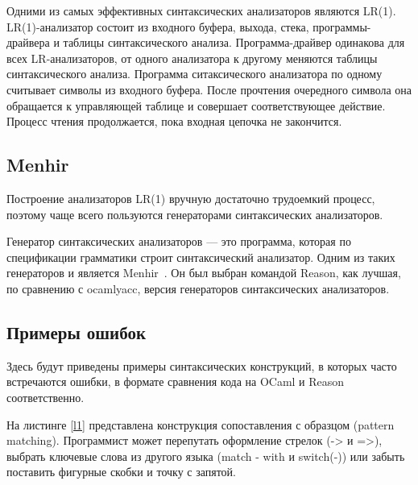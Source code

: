 Одними из самых эффективных синтаксических анализаторов являются LR(1)\cite{LRSpeed}. LR(1)-анализатор состоит из входного буфера, выхода, стека, программы-драйвера и таблицы синтаксического анализа. Программа-драйвер одинакова для всех LR-анализаторов, от одного анализатора к другому меняются таблицы синтаксического анализа. Программа ситаксического анализатора по одному считывает символы из входного буфера. После прочтения очередного символа она обращается к управляющей таблице и совершает соответствующее действие. Процесс чтения продолжается, пока входная цепочка не закончится.

\subsection{Menhir}
Построение анализаторов LR(1) вручную достаточно трудоемкий процесс, поэтому чаще всего пользуются генераторами синтаксических анализаторов. 

Генератор синтаксических анализаторов --- это программа, которая по спецификации грамматики строит синтаксический анализатор. Одним из таких генераторов и является Menhir~\cite{ME}. Он был выбран командой Reason, как лучшая, по сравнению с ocamlyacc, версия генераторов синтаксических анализаторов.



\subsection{Примеры ошибок}

Здесь будут приведены примеры синтаксических конструкций, в которых часто встречаются ошибки, в формате сравнения кода на OCaml и Reason соответственно.

\hfill


\begin{example}
	\begin{subexample}[b]{\textwidth}
		
		\caption{}
	\end{subexample}
	\hfill
	
	\begin{subexample}[b]{\textwidth}
		
		\caption{}
	\end{subexample}
\caption{}\label{l1}
\end{example}

На листинге \ref{l1} представлена конструкция сопоставления с образцом (pattern matching). Программист может перепутать оформление стрелок (-> и =>), выбрать ключевые слова из другого языка (match - with и switch(-)) или забыть поставить фигурные скобки и точку с запятой.


